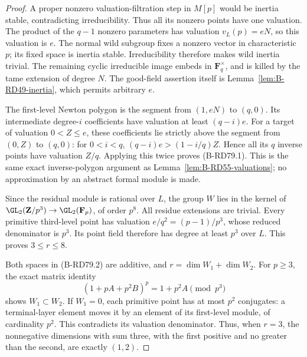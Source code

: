 \begin{proof}
A proper nonzero valuation-filtration step in \(M[p]\) would be
inertia stable, contradicting irreducibility. Thus all its nonzero
points have one valuation. The product of the \(q-1\) nonzero
parameters has valuation \(v_L(p)=eN\), so this valuation is \(e\).
The normal wild subgroup fixes a nonzero vector in characteristic
\(p\); its fixed space is inertia stable. Irreducibility therefore
makes wild inertia trivial. The remaining cyclic irreducible
image embeds in \(\mathbf F_q^\times\), and is killed by the tame
extension of degree \(N\). The good-field assertion itself is
Lemma~\ref{lem:B-RD49-inertia}, which permits arbitrary \(e\).

The first-level Newton polygon is the segment from \((1,eN)\)
to \((q,0)\). Its intermediate degree-\(i\) coefficients have
valuation at least \((q-i)e\). For a target of valuation
\(0<Z\le e\), these coefficients lie strictly above the segment
from \((0,Z)\) to \((q,0)\): for \(0<i<q\),
\((q-i)e>(1-i/q)Z\). Hence all its \(q\) inverse points have
valuation \(Z/q\). Applying this twice proves (B-RD79.1).
This is the same exact inverse-polygon argument as
Lemma~\ref{lem:B-RD55-valuations}; no approximation by an abstract
formal module is made.

Since the residual module is rational over \(L\), the group \(W\)
lies in the kernel of
\(\GL_2(\mathbf Z/p^3)\to\GL_2(\mathbf F_p)\), of order \(p^8\).
All residue extensions are trivial. Every primitive third-level
point has valuation
\(e/q^2=(p-1)/p^3\), whose reduced denominator is \(p^3\).
Its point field therefore has degree at least \(p^3\) over \(L\).
This proves \(3\le r\le8\).

Both spaces in (B-RD79.2) are additive, and
\(r=\dim W_1+\dim W_2\). For \(p\ge3\), the exact matrix identity
\[
       (1+pA+p^2B)^p=1+p^2A\pmod{p^3}
                                                     \tag{B-RD79.3}
\]
shows \(W_1\subset W_2\). If \(W_1=0\), each primitive point
has at most \(p^2\) conjugates: a terminal-layer element moves
it by an element of its first-level module, of cardinality \(p^2\).
This contradicts its valuation denominator. Thus, when \(r=3\),
the nonnegative dimensions with sum three, with the first positive
and no greater than the second, are exactly \((1,2)\).
\end{proof}

